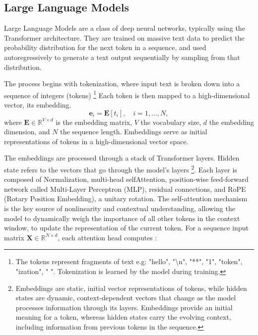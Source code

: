 \documentclass[a4paper,12pt]{article}
\begin{document}
    \subsection{Large Language Models}
    \label{subsec:llms}
    Large Language Models are a class of deep neural networks, typically using the Transformer architecture. They are trained on massive text data to predict the probability distribution for the next token in a sequence, and used autoregressively to generate a text output sequentially by sampling from that distribution.

    The process begins with tokenization, where input text is broken down into a sequence of integers (tokens) \footnote{The tokens represent fragments of text e.g: "hello", "\textbackslash n", "**", "1", "token", "ization", " ". Tokenization is learned by the model during training.} Each token is then mapped to a high-dimensional vector, its embedding.
    \begin{equation}
        \mathbf{e}_i = \mathbf{E}[t_i], \quad i = 1, \dots, N,
    \end{equation}
    where $\mathbf{E} \in \mathbb{R}^{V \times d}$ is the embedding matrix, $V$ the vocabulary size, $d$ the embedding dimension, and $N$ the sequence length. Embeddings serve as initial representations of tokens in a high-dimensional vector space. 

    The embeddings are processed through a stack of Transformer layers. Hidden state refers to the vectors that go through the model's layers \footnote{Embeddings are static, initial vector representations of tokens, while hidden states are dynamic, context-dependent vectors that change as the model processes information through its layers. Embeddings provide an initial meaning for a token, whereas hidden states carry the evolving context, including information from previous tokens in the sequence.}. Each layer is composed of Normalization, multi-head selfAttention, position-wise feed-forward network called Multi-Layer Perceptron (MLP), residual connections, and RoPE (Rotary Position Embedding), a unitary rotation. The self-attention mechanism is the key source of nonlinearity and contextual understanding, allowing the model to dynamically weigh the importance of all other tokens in the context window, to update the representation of the current token. For a sequence input matrix $\mathbf{X} \in \mathbb{R}^{N \times d}$, each attention head computes \cite{attention}:
\end{document}
